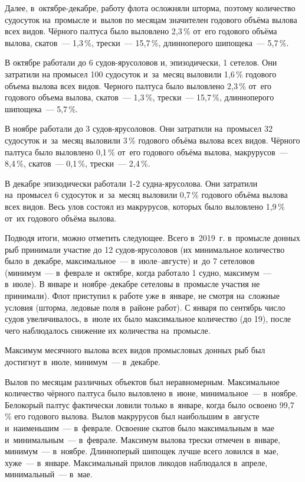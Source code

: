 Далее, в~октябре-декабре, работу флота осложняли шторма, поэтому количество судосуток на~промысле и~вылов по месяцам значителен годового объёма вылова всех видов. Чёрного палтуса было выловлено 2,3\,\% от~его годового объёма вылова, скатов~--- 1,3\,\%, трески~--- 15,7\,\%, длинноперого шипощека~--- 5,7\,\%.

В октябре работали до 6 судов-ярусоловов и, эпизодически, 1 сетелов. Они затратили на промысел 100 судосуток и~за~месяц выловили 1,6\,\% годового объема вылова всех видов. Черного палтуса было выловлено 2,3\,\% от~его годового объема вылова, скатов~--- 1,3\,\%, трески~--- 15,7\,\%, длинноперого шипощека~--- 5,7\,\%.

В ноябре работали до 3 судов-ярусоловов. Они затратили на~промысел 32 судосуток и~за~месяц выловили 3\,\% годового объёма вылова всех видов. Чёрного палтуса было выловлено 0,1\,\% от~его годового объёма вылова, макрурусов~--- 8,4\,\%, скатов~--- 0,1\,\%, трески~--- 2,4\,\%.

В декабре эпизодически работали 1-2 судна-ярусолова. Они затратили на~промысел 6 судосуток и~за~месяц выловили 0,7\,\% годового объёма вылова всех видов. Весь улов состоял из макрурусов, которых было выловлено 1,9\,\% от~их годового объёма вылова.

Подводя итоги, можно отметить следующее. Всего в~2019~г. в~промысле донных рыб принимали участие до 12 судов-ярусоловов (их минимальное количество было в~декабре, максимальное~--- в~июле--августе) и~до 7 сетеловов (минимум~--- в~феврале и~октябре, когда работало 1 судно, максимум~--- в~июле). В январе и~ноябре--декабре сетеловы в~промысле участия не принимали). Флот приступил к работе уже в~январе, не смотря на~сложные условия (шторма, ледовые поля в~районе работ). С января по сентябрь число судов увеличивалось, в~июле их было максимальное количество (до 19), после чего наблюдалось снижение их количества на~промысле.

Максимум месячного вылова всех видов промысловых донных рыб был достигнут в~июле, минимум~--- в~декабре.

Вылов по месяцам различных объектов был неравномерным. Максимальное количество чёрного палтуса было выловлено в~июне, минимальное~--- в~ноябре. Белокорый палтус фактически ловили только в~январе, когда было освоено 99,7\,\% его годового вылова. Вылов макрурусов был наибольшим в~августе и~наименьшим~--- в~феврале. Освоение скатов было максимальным в~мае и~минимальным~--- в~феврале. Максимум вылова трески отмечен в~январе, минимум~--- в~ноябре. Длинноперый шипощек лучше всего ловился в~мае, хуже~--- в~январе. Максимальный прилов ликодов наблюдался в~апреле, минимальный~--- в~мае.


